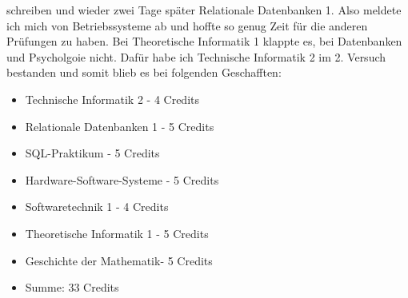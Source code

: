 schreiben und wieder zwei Tage später Relationale Datenbanken 1. Also
meldete ich mich von Betriebssysteme ab und hoffte so genug Zeit für
die anderen Prüfungen zu haben. Bei Theoretische Informatik 1 klappte
es, bei Datenbanken und Psycholgoie nicht. Dafür habe ich Technische Informatik 2 im
2. Versuch bestanden und somit blieb es bei folgenden Geschafften:
\begin{itemize}
\item Technische Informatik 2 - 4 Credits
\item Relationale Datenbanken 1 - 5 Credits 
\item SQL-Praktikum - 5 Credits
\item Hardware-Software-Systeme - 5 Credits
\item Softwaretechnik 1 - 4 Credits
\item Theoretische Informatik 1 - 5 Credits
\item Geschichte der Mathematik- 5 Credits
\item Summe: 33 Credits
\end{itemize}

